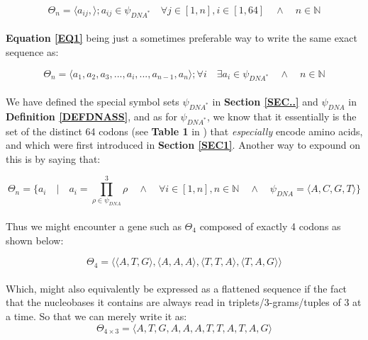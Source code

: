 \documentclass[a4paper, 18pt]{article} %
\begin{document}
\begin{equation}
\label{EQ1}
\Theta_n = \langle a_{ij}, \rangle ;
a_{ij} \in \psi_{DNA^*} \quad \forall j \in [1,n],  i \in [1,64] \quad \land \quad n \in \mathbb{N}
\end{equation}\\

\textbf{Equation \ref{EQ1}} being just a sometimes preferable way to write the same exact sequence as:
 
 
 \begin{equation}
\label{EQ2}
\Theta_n = \langle a_1,a_2,a_3,...,a_i,...,a_{n-1},a_n \rangle ;
\forall i \quad \exists a_i \in \psi_{DNA^*} \quad \land \quad n \in \mathbb{N}
\end{equation}\\

We have defined the special symbol sets $\psi_{DNA^*}$ in \textbf{Section \ref{SEC..}} and  $\psi_{DNA}$ in \textbf{Definition \ref{DEFDNASS}}, and as for $\psi_{DNA^*}$, we know that it essentially is the set of the distinct 64 codons (see \textbf{Table 1} in \cite{gregory1987oxford}) that \textit{especially} encode amino acids, and which were first introduced in \textbf{Section \ref{SEC1}}. Another way to expound on this is by saying that:

 \begin{equation}
\label{EQ3}
\Theta_n = \{a_i \quad | \quad a_i = \prod\limits_{\rho \in \psi_{DNA}}^3 \rho \quad \land \quad \forall i \in [1,n], n \in \mathbb{N} \quad \land \quad \psi_{DNA} = \langle A, C, G, T \rangle\}
\end{equation}\\

Thus we might encounter a gene such as $\Theta_4$ composed of exactly 4 codons as shown below:

 \begin{equation}
\label{EQ4}
\Theta_4 = \langle \langle A, T, G \rangle, \langle A, A, A \rangle, \langle T, T, A \rangle, \langle T, A, G \rangle \rangle
\end{equation}\\

Which, might also equivalently be expressed as a flattened sequence if the fact that the nucleobases it contains are always read in triplets/3-grams/tuples of 3 at a time. So that we can merely write it as:\\

 \begin{equation}
\label{EQ5}
\Theta_{4 \times 3} = \langle  A, T, G, A, A, A, T, T, A, T, A, G \rangle
\end{equation}\\
\end{document}
